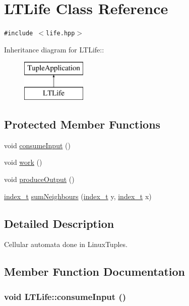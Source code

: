 \hypertarget{class_l_t_life}{
\section{LTLife Class Reference}
\label{class_l_t_life}
}
{\tt \#include $<$life.hpp$>$}

Inheritance diagram for LTLife::\begin{figure}[H]
\begin{center}
\leavevmode
\includegraphics[height=2cm]{class_l_t_life}
\end{center}
\end{figure}
\subsection*{Protected Member Functions}
\begin{CompactItemize}
\item 
void \hyperlink{class_l_t_life_da0a691f9bf8bb055a4fe953dd6eb809}{consumeInput} ()
\item 
void \hyperlink{class_l_t_life_c0600864c1742c2a12e15992c539c2da}{work} ()
\item 
void \hyperlink{class_l_t_life_a0ac21131813f89a94c6ba7515e63c11}{produceOutput} ()
\item 
\hyperlink{cowichan_8hpp_5b04577d5d21124855deaad298595371}{index\_\-t} \hyperlink{class_l_t_life_c63c1d93bcffbd2415d23a189c46bce7}{sumNeighbours} (\hyperlink{cowichan_8hpp_5b04577d5d21124855deaad298595371}{index\_\-t} y, \hyperlink{cowichan_8hpp_5b04577d5d21124855deaad298595371}{index\_\-t} x)
\end{CompactItemize}


\subsection{Detailed Description}
Cellular automata done in LinuxTuples. 

\subsection{Member Function Documentation}
\hypertarget{class_l_t_life_da0a691f9bf8bb055a4fe953dd6eb809}{
\subsubsection[{consumeInput}]{\setlength{\rightskip}{0pt plus 5cm}void LTLife::consumeInput ()}}
\label{class_l_t_life_da0a691f9bf8bb055a4fe953dd6eb809}


